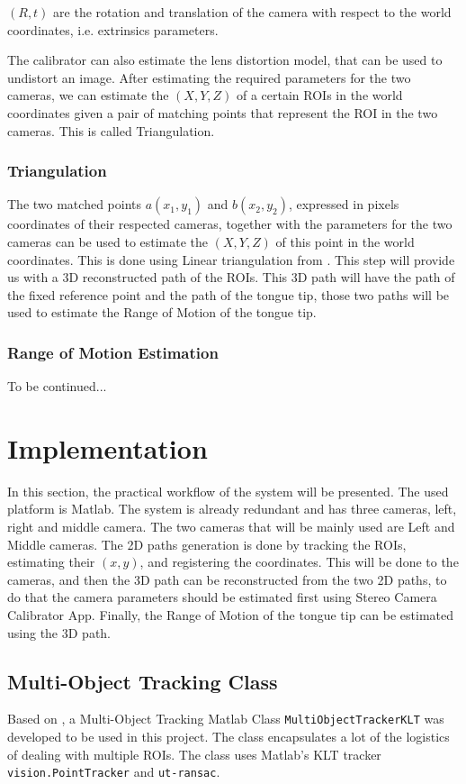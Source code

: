 \documentclass[journal]{IEEEtran}
\begin{document}
$(R,t)$ are the rotation and translation of the camera with respect to the world coordinates, i.e. extrinsics parameters.

The calibrator can also estimate the lens distortion model, that can be used to undistort an image. After estimating the required parameters for the two cameras, we can estimate the $(X, Y, Z)$ of a certain ROIs in the world coordinates given a pair of matching points that represent the ROI in the two cameras. This is called Triangulation.
\subsubsection{Triangulation}
The two matched points $a(x_1 , y_1)$ and $b(x_2 , y_2)$, expressed in pixels coordinates of their respected cameras, together with the parameters for the two cameras can be used to estimate the $(X, Y, Z)$ of this point in the world coordinates. This is done using Linear triangulation from \cite{triangulation}. This step will provide us with a 3D reconstructed path of the ROIs. This 3D path will have the path of the fixed reference point and the path of the tongue tip, those two paths will be used to estimate the Range of Motion of the tongue tip.
\subsubsection{Range of Motion Estimation}
To be continued...
\section{Implementation}
In this section, the practical workflow of the system will be presented. The used platform is Matlab. The system is already redundant and has three cameras, left, right and middle camera. The two cameras that will be mainly used are Left and Middle cameras. The 2D paths generation is done by tracking the ROIs, estimating their $(x,y)$, and registering the coordinates. This will be done to the cameras, and then the 3D path can be reconstructed from the two 2D paths, to do that the camera parameters should be estimated first using Stereo Camera Calibrator App. Finally, the Range of Motion of the tongue tip can be estimated using the 3D path. 
\subsection{Multi-Object Tracking Class}
Based on \cite{matlabClass}, a Multi-Object Tracking Matlab Class \texttt{MultiObjectTrackerKLT} was developed to be used in this project. The class encapsulates a lot of the logistics of dealing with multiple ROIs. The class uses Matlab's KLT tracker \texttt{vision.PointTracker} and \texttt{{ut-ransac}}.
\end{document}
